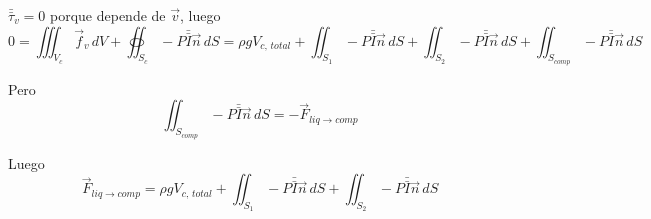 			$\bar{\bar \tau}_v = 0$ porque depende de $\vec v$, luego
			\[0 = \iiint_{V_c} \vec f_v\,dV + \oiint_{S_c}-P\bar{\bar I}\vec n\,dS = \rho g V_{c,\,total} + \iint_{S_1} - P\bar{\bar I}\vec n\,dS + \iint_{S_2} - P\bar{\bar I}\vec n\,dS + \iint_{S_{comp}} - P\bar{\bar I}\vec n\,dS\]


			Pero $$\iint_{S_{comp}} - P\bar{\bar I}\vec n\,dS = -\vec F_{liq\rightarrow comp}$$
			
			
			Luego
			\[\vec F_{liq\rightarrow comp} = \rho g V_{c,\,total} + \iint_{S_1} - P\bar{\bar I}\vec n\,dS + \iint_{S_2} - P\bar{\bar I}\vec n\,dS\]